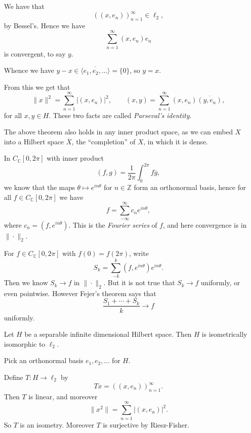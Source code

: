 \documentclass[12pt]{article}
\begin{document}
\begin{proofbox}
	We have that
	\[
		((x, e_n))_{n = 1}^{\infty} \in \ell_2,
	\]
	by Bessel's. Hence we have
	\[
	\sum_{n = 1}^{\infty} (x, e_n) e_n
	\]
	is convergent, to say $y$.

	Whence we have $y - x \in \overline{\langle e_1, e_2, \ldots \rangle} = \{0\}$, so $y = x$.
\end{proofbox}

From this we get that
\[
	\|x\|^2 = \sum_{n = 1}^{\infty} |(x, e_n)|^2, \qquad (x, y) = \sum_{n = 1}^{\infty} (x, e_n)\overline{(y, e_n)},
\]
for all $x, y \in H$. These two facts are called \emph{Parseval's identity}.

\begin{remark}
	The above theorem also holds in any inner product space, as we can embed $X$ into a Hilbert space $\overline{X}$, the ``completion'' of $X$, in which it is dense.
\end{remark}

\begin{exbox}
	In $C_{\mathbb{C}}[0, 2\pi]$ with inner product
	\[
		(f, g) = \frac{1}{2 \pi} \int_0^{2\pi} f \overline{g},
	\]
	we know that the maps $\theta \mapsto e^{i n \theta}$ for $n \in \mathbb{Z}$ form an orthonormal basis, hence for all $f \in C_{\mathbb{C}}[0, 2\pi]$ we have
	\[
	f = \sum_{-\infty}^{\infty} c_n e^{in \theta},
	\]
	where $c_n = (f, e^{in \theta})$. This is the \emph{Fourier series} of $f$, and here convergence is in $\|\cdot\|_2$.

	For $f \in C_{\mathbb{C}}[0, 2\pi]$ with $f(0) = f(2\pi)$, write
	\[
	S_k = \sum_{-k}^{k} (f, e^{in \theta})e^{in\theta}.
	\]
	Then we know $S_k \to f$ in $\|\cdot\|_2$. But it is not true that $S_k \to f$ uniformly, or even pointwise. However Fejer's theorem says that
	\[
	\frac{S_1 + \cdots + S_k}{k} \to f
	\]
	uniformly.
\end{exbox}

\begin{corollary}
	Let $H$ be a separable infinite dimensional Hilbert space. Then $H$ is isometrically isomorphic to $\ell_2$.
\end{corollary}

\begin{proofbox}
	Pick an orthonormal basis $e_1, e_2, \ldots$ for $H$.

	Define $T : H \to \ell_2$ by
	\[
	Tx = ((x, e_n))_{n = 1}^{\infty}.
	\]
	Then $T$ is linear, and moreover
	\[
	\|x^2\| = \sum_{n = 1}^{\infty} |(x, e_n)|^2.
	\]
	So $T$ is an isometry. Moreover $T$ is surjective by Riesz-Fisher.
\end{proofbox}
\end{document}
